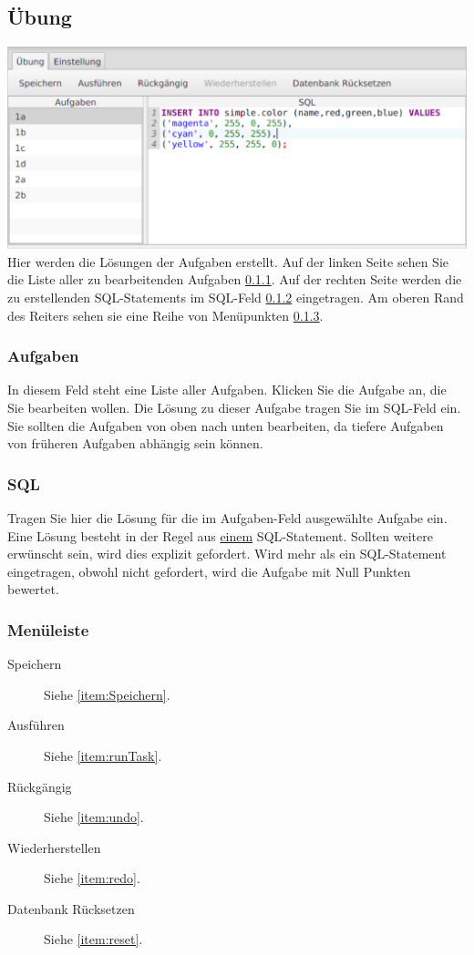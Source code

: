 \documentclass[11pt]{article}
\begin{document}
\subsection{Übung}
\label{subsec:Uebung}
\includegraphics[width=1.0\textwidth]{figures/exercise}
Hier werden die Lösungen der Aufgaben erstellt. Auf der linken Seite sehen Sie die Liste aller zu bearbeitenden Aufgaben \ref{subsubsec:Aufgaben}. Auf der rechten Seite werden die zu erstellenden SQL-Statements im SQL-Feld \ref{subsubsec:SQL} eingetragen. Am oberen Rand des Reiters sehen sie eine Reihe von Menüpunkten \ref{subsubsec:AufgabenMenu}.

\subsubsection{Aufgaben}
\label{subsubsec:Aufgaben}
In diesem Feld steht eine Liste aller Aufgaben. Klicken Sie die Aufgabe an, die Sie bearbeiten wollen. Die Lösung zu dieser Aufgabe tragen Sie im SQL-Feld ein. Sie sollten die Aufgaben von oben nach unten bearbeiten, da tiefere Aufgaben von früheren Aufgaben abhängig sein können.   

\subsubsection{SQL}
\label{subsubsec:SQL}	
Tragen Sie hier die Lösung für die im Aufgaben-Feld ausgewählte Aufgabe ein. Eine Lösung besteht in der Regel aus \underline{einem} SQL-Statement. Sollten weitere erwünscht sein, wird dies explizit gefordert. Wird mehr als ein SQL-Statement eingetragen, obwohl nicht gefordert, wird die Aufgabe mit Null Punkten bewertet.

\subsubsection{Menüleiste}
\label{subsubsec:AufgabenMenu}
\begin{description}
	\item[Speichern] Siehe \ref{item:Speichern}.
	\item[Ausführen] Siehe \ref{item:runTask}.
	\item[Rückgängig] Siehe \ref{item:undo}.
	\item[Wiederherstellen] Siehe \ref{item:redo}.
	\item[Datenbank Rücksetzen] Siehe \ref{item:reset}.
\end{description}
\end{document}
